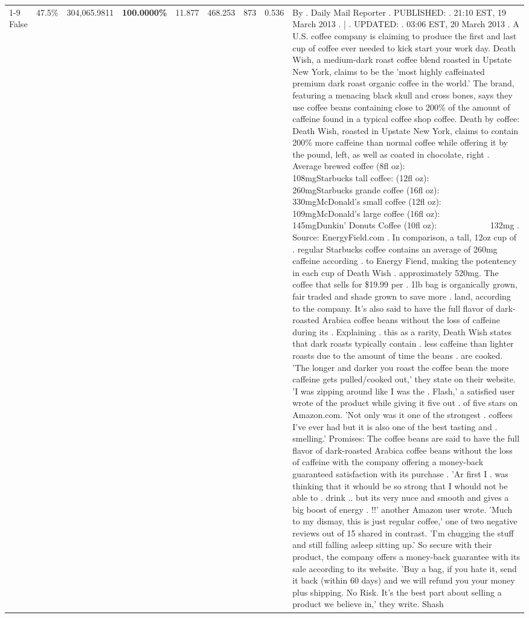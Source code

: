 \begin{table}[H]
{\begin{tabular}{lllrlllll}
\cline{1-9}
False & 47.5\% & 304,065.9811 & \bfseries \color{red} 100.0000\% & 11.877 & 468.253 & 873 & 0.536 & By . Daily Mail Reporter . PUBLISHED: . 21:10 EST, 19 March 2013 . | . UPDATED: . 03:06 EST, 20 March 2013 . A U.S. coffee company is claiming to produce the first and last cup of coffee ever needed to kick start your work day. Death Wish, a medium-dark roast coffee blend roasted in Upstate New York, claims to be the 'most highly caffeinated premium dark roast organic coffee in the world.' The brand, featuring a menacing black skull and cross bones, says they use coffee beans containing close to 200\% of the amount of caffeine found in a typical coffee shop coffee. Death by coffee: Death Wish, roasted in Upstate New York, claims to contain 200\% more caffeine than normal coffee while offering it by the pound, left, as well as coated in chocolate, right . Average brewed coffee (8fl oz):              108mgStarbucks tall coffee: (12fl oz):                260mgStarbucks grande coffee (16fl oz):         330mgMcDonald's small coffee (12fl oz):           109mgMcDonald's large coffee (16fl oz):           145mgDunkin' Donuts Coffee (10fl oz):             132mg . Source: EnergyField.com . In comparison, a tall, 12oz cup of . regular Starbucks coffee contains an average of 260mg caffeine according . to Energy Fiend, making the potentency in each cup of Death Wish . approximately 520mg. The coffee that sells for \$19.99 per . 1lb bag is organically grown, fair traded and shade grown to save more . land, according to the company. It's also said to have the full flavor of dark-roasted Arabica coffee beans without the loss of caffeine during its . Explaining . this as a rarity, Death Wish states that dark roasts typically contain . less caffeine than lighter roasts due to the amount of time the beans . are cooked. 'The longer and darker you roast the coffee bean the more caffeine gets pulled/cooked out,' they state on their website. 'I was zipping around like I was the . Flash,' a satisfied user wrote of the product while giving it five out . of five stars on Amazon.com. 'Not only was it one of the strongest . coffees I've ever had but it is also one of the best tasting and . smelling.’ Promises: The coffee beans are said to have the full flavor of dark-roasted Arabica coffee beans without the loss of caffeine with the company offering a money-back guaranteed satisfaction with its purchase . 'Ar first I . was thinking that it whould be so strong that I whould not be able to . drink .. but its very nuce and smooth and gives a big boost of energy . !!' another Amazon user wrote. 'Much to my dismay, this is just regular coffee,' one of two negative reviews out of 15 shared in contrast. 'I'm chugging the stuff and still falling asleep sitting up.' So secure with their product, the company offers a money-back guarantee with its sale according to its website. 'Buy a bag, if you hate it, send it back (within 60 days) and we will refund you your money plus shipping. No Risk. It’s the best part about selling a product we believe in,' they write. Shash \\

\end{tabular}}
\end{table}
